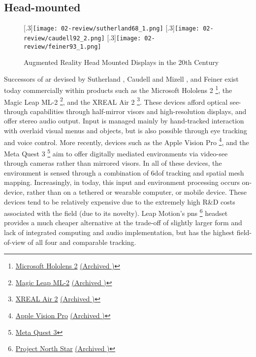 \subsection{Head-mounted}\label{sec: ar-forms-hmd}
\begin{figure}
    \centering
    \captionsetup{justification=centering}
    [.3\linewidth]{\texttt{[image: 02-review/sutherland68\_1.png]}}
    \hfill
    [.3\linewidth]{\texttt{[image: 02-review/caudell92\_2.png]}}
    \hfill
    [.3\linewidth]{\texttt{[image: 02-review/feiner93\_1.png]}}%
    \caption{Augmented Reality Head Mounted Displays in the 20th Century}
    \label{fig: historicalHMDs}
\end{figure}
Successors of \gls{ar}  devised by Sutherland \citeyearpar{sutherland1968}, Caudell and Mizell \citeyearpar{caudell1992}, and Feiner \citeyearpar{feiner1993,feiner1997} exist today commercially within products such as the Microsoft Hololens 2 \footnote{\href{https://www.microsoft.com/en-us/hololens}{Microsoft Hololens 2} \href{https://archive.today/JM6pi}{(Archived \faArchive)}}, the Magic Leap ML-2 \footnote{\href{https://www.magicleap.com/magic-leap-2}{Magic Leap ML-2} \href{https://archive.today/EB2zn}{(Archived \faArchive)}}, and the XREAL Air 2 \footnote{\href{https://www.xreal.com/air2}{XREAL Air 2} \href{https://archive.today/L45D4}{(Archived \faArchive)}}. These devices afford optical see-through capabilities through half-mirror visors and high-resolution displays, and offer stereo audio output. Input is managed mainly by hand-tracked interaction with overlaid visual menus and objects, but is also possible through eye tracking and voice control. More recently, devices such as the Apple Vision Pro \footnote{\href{https://www.apple.com/apple-vision-pro/}{Apple Vision Pro} \href{https://archive.today/TGrNh}{(Archived \faArchive)}}, and the Meta Quest 3 \footnote{\href{https://www.meta.com/gb/quest/quest-3//}{Meta Quest 3}} aim to offer digitally mediated environments via video-see through cameras rather than mirrored visors. In all of these devices, the environment is sensed through a combination of \gls{6dof} tracking and spatial mesh mapping. Increasingly, in  today, this input and environment processing occurs on-device, rather than on a tethered or wearable computer, or mobile device. These devices tend to be relatively expensive due to the extremely high R\&D costs associated with the field (due to its novelty). Leap Motion's  \gls{pns} \footnote{\href{https://docs.projectnorthstar.org/}{Project North Star} \href{https://archive.today/ZNV3O}{(Archived \faArchive)}} headset provides a much cheaper alternative at the trade-off of slightly larger form and lack of integrated computing and audio implementation, but has the highest field-of-view of all four and comparable tracking.

